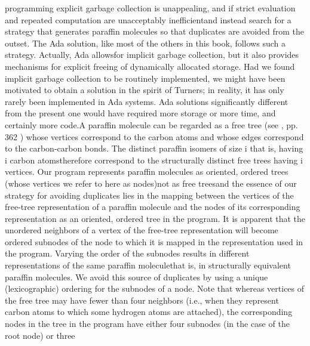 programming explicit garbage collection is unappealing, and if strict
evaluation and repeated computation are unacceptably inefficient\EmDash[]and
instead search for a strategy that generates paraffin molecules so
that duplicates are avoided from the outset. The Ada solution, like
most of the others in this book, follows such a strategy.%
\NtFoot[]\NtNtpar[]Actually, Ada \txtxemph[]allows\txtxendemph[] for
implicit garbage collection, but it also provides mechanisms for explicit
freeing of dynamically allocated storage. Had we found implicit garbage
collection to be routinely implemented, we might have been motivated
to obtain a solution in the spirit of Turner\rsquo[]s; in reality,
it has only rarely been implemented in Ada systems. Ada solutions
significantly different from the present one would have required more
storage or more time, and certainly more code.\NtEndntpar[]%
\NtEndfoot[]\Endpara[]
\Para[]A paraffin molecule can be regarded as a free tree (see %
\Endcit[], \Nobr[]pp. 362%
\Endnobr[]) whose vertices correspond to the carbon atoms and whose
edges correspond to the carbon-carbon bonds. The distinct paraffin
isomers of size \InlEqn[]\LmthEqn[]i
\LmthEndeqn[]\EndInlEqn[]\EmDash[]that is, having %
\InlEqn[]\LmthEqn[]i
\LmthEndeqn[]\EndInlEqn[] carbon atoms\EmDash[]therefore correspond to
the structurally distinct free trees having \InlEqn[]\LmthEqn[]i
\LmthEndeqn[]%
\EndInlEqn[] vertices. Our program represents paraffin molecules as
oriented, ordered trees (whose vertices we refer to here as nodes)\EmDash[]not
as free trees\EmDash[]and the essence of our strategy for avoiding
duplicates lies in the mapping between the vertices of the free-tree
representation of a paraffin molecule and the nodes of its corresponding
representation as an oriented, ordered tree in the program.%
\Endpara[]
\Para[]It is apparent that the unordered neighbors of a vertex of
the free-tree representation will become ordered subnodes of the node
to which it is mapped in the representation used in the program. Varying
the order of the subnodes results in different representations of
the same paraffin molecule\EmDash[]that is, in structurally equivalent
paraffin molecules. We avoid this source of duplicates by using a
unique (lexicographic) ordering for the subnodes of a node. Note that
whereas vertices of the free tree may have fewer than four neighbors
(i.e., when they represent carbon atoms to which some hydrogen atoms
are attached), the corresponding nodes in the tree in the program
have either four subnodes (in the case of the root node) or three
